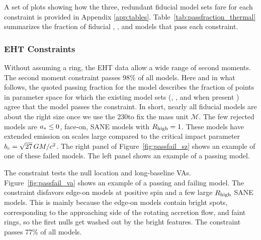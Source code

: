 A set of plots showing how the three, redundant fiducial model sets fare for each constraint is provided in Appendix \ref{app:tables}.
Table~\ref{tab:passfraction_thermal} summarizes the fraction of fiducial \kharma, \bhac, and \hamr models that pass each constraint.

\subsubsection{EHT Constraints}\label{sec:constraints}



Without assuming a ring, the EHT data allow a wide range of second moments.
The second moment constraint passes $98\%$ of all models.  Here and in what follows, the quoted passing fraction for the model describes the fraction of points in parameter space for which the existing model sets (\kharma, \bhac, and when present \hamr) agree that the model passes the constraint.
In short, nearly all fiducial models are about the right size once we use the 230\GHz to fix the mass unit $\mathcal{M}$.
The few rejected models are $a_* \le 0$, face-on, SANE models with $R_\mathrm{high} = 1$.
These models have extended emission on scales large compared to the critical impact parameter $b_c = \sqrt{27}\,GM/c^2$.
The right panel of Figure~\ref{fig:passfail_sz} shows an example of one of these failed models.  The left panel shows an example of a passing model.

\label{sec:vam}

The \vam constraint tests the null location and long-baseline VAs.  Figure~\ref{fig:passfail_va} shows an example of a passing and failing model.
The constraint disfavors edge-on models at positive spin and a few large $R_\mathrm{high}$ SANE models.
This is mainly because the edge-on models contain bright spots, corresponding to the approaching side of the rotating accretion flow, and faint rings, so the first nulls get washed out by the bright features.
The \vam constraint passes 77\% of all models.

